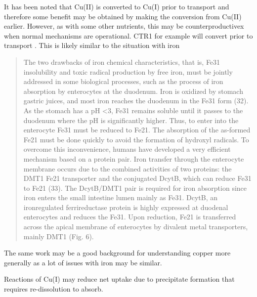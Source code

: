 It has been noted that Cu(II) is converted to Cu(I) prior
to transport and therefore some benefit may be
obtained by making the conversion from Cu(II) earlier.
However, as with some other nutrients, this may
be counterproductivex when normal mechanisms are operational.
CTR1 for example will convert prior to transport
\cite{Kar_Sen_Maji_Copper_import_2022}.
This is likely similar to the situation with iron
\cite{Sanchez_Sabio_Galvez_Iron_chemistry_2017}
\begin{quote}
The two drawbacks of iron chemical characteristics, that is, Fe31 insolubility
and toxic radical production by free iron, must be jointly addressed in
some biological processes, such as the process of iron absorption by enterocytes
at the duodenum. Iron is oxidized by stomach gastric juices, and most iron
reaches the duodenum in the Fe31 form (32). As the stomach has a pH <3,
Fe31 remains soluble until it passes to the duodenum where the pH is significantly
higher. Thus, to enter into the enterocyte Fe31 must be reduced to Fe21.
The absorption of the as-formed Fe21 must be done quickly to avoid the formation
of hydroxyl radicals. To overcome this inconvenience, humans have developed
a very efficient mechanism based on a protein pair. Iron transfer through
the enterocyte membrane occurs due to the combined activities of two proteins:
the DMT1 Fe21 transporter and the conjugated DcytB, which can reduce Fe31
to Fe21 (33). The DcytB/DMT1 pair is required for iron absorption since
iron enters the small intestine lumen mainly as Fe31. DcytB, an ironregulated
ferrireductase protein is highly expressed at duodenal enterocytes and reduces
the Fe31. Upon reduction, Fe21 is transferred across the apical membrane
of enterocytes by divalent metal transporters, mainly DMT1 (Fig. 6).
\end{quote}

The same work
\cite{Sanchez_Sabio_Galvez_Iron_chemistry_2017}
may be a good background for understanding copper more generally
as a lot of issues with iron may be similar. 



Reactions of Cu(I) may reduce net uptake due to precipitate
formation that requires re-dissolution to absorb.


